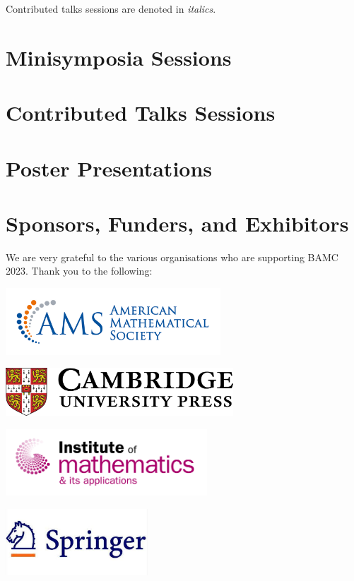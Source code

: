 \documentclass[12pt,a4paper]{article}
\begin{document}
Contributed talks sessions are denoted in \textit{italics}.

\section{Minisymposia Sessions}



\section{Contributed Talks Sessions}



\section{Poster Presentations}

{\footnotesize\raggedright}

\section{Sponsors, Funders, and Exhibitors}

We are very grateful to the various organisations who are supporting BAMC 2023. Thank you to the following:\bigskip

{\centering
\includegraphics[height=2.5cm]{ams-logo.png}

\includegraphics[height=1.8cm]{cup-logo.png}

\includegraphics[height=2.5cm]{ima-logo.png}

\includegraphics[height=2.5cm]{springer-logo.jpg}

}
\end{document}
